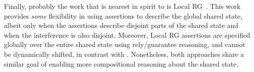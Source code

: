 Finally, probably the work that is nearest in spirit to  \colosl is
Local RG~\cite{lrg}. This work provides {\em some}  flexibility in using
assertions to describe the global shared state,
 albeit only
when the assertions describe disjoint parts of the shared state  and when
the interference is  also disjoint. Moreover, Local
RG assertions are specified globally over the entire shared state
using rely/guarantee reasoning, and
cannot be dynamically shifted, in contrast with
\colosl. Nonetheless, both approaches share a similar goal of enabling
more compositional reasoning about the shared state.









